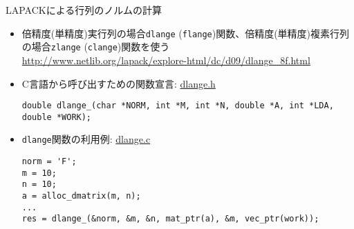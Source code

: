 \begin{frame}[t,fragile]{LAPACKによる行列のノルムの計算}
  \begin{itemize}
  \item 倍精度(単精度)実行列の場合{\tt dlange} ({\tt flange})関数、倍精度(単精度)複素行列の場合{\tt zlange} ({\tt clange})関数を使う \\
    \url{http://www.netlib.org/lapack/explore-html/dc/d09/dlange_8f.html}
  \item C言語から呼び出すための関数宣言: \href{https://github.com/todo-group/computer-experiments/blob/master/exercise/matrix/dlange.h}{dlange.h}
\begin{lstlisting}
double dlange_(char *NORM, int *M, int *N, double *A, int *LDA, double *WORK);
\end{lstlisting}
\item {\tt dlange}関数の利用例: \href{https://github.com/todo-group/computer-experiments/blob/master/exercise/matrix/dlange.c}{dlange.c}
\begin{lstlisting}
norm = 'F';
m = 10;
n = 10;
a = alloc_dmatrix(m, n);
...
res = dlange_(&norm, &m, &n, mat_ptr(a), &m, vec_ptr(work));
\end{lstlisting}
  \end{itemize}
\end{frame}
